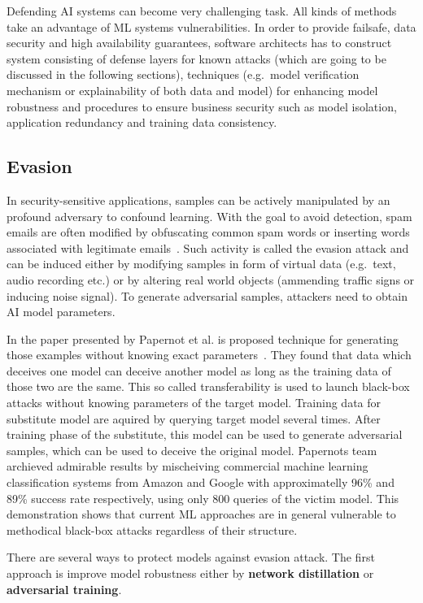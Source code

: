 Defending AI systems can become very challenging task.
All kinds of methods take an advantage of ML systems vulnerabilities.
In order to provide failsafe, data security and high availability guarantees, software architects has to construct system consisting of defense layers for known attacks (which are going to be discussed in the following sections), techniques (e.g.\ model verification mechanism or explainability of both data and model) for enhancing model robustness and procedures to ensure business security such as model isolation, application redundancy and training data consistency.

\subsection{Evasion}\label{subsec:evasion}

In security-sensitive applications, samples can be actively manipulated by an profound adversary to confound learning.
With the goal to avoid detection, spam emails are often modified by obfuscating common spam words or inserting words associated with legitimate emails~\cite{arxiv:evasion_attack}.
Such activity is called the evasion attack and can be induced either by modifying samples in form of virtual data (e.g.\ text, audio recording etc.) or by altering real world objects (ammending traffic signs or inducing noise signal).
To generate adversarial samples, attackers need to obtain AI model parameters.

In the paper presented by Papernot et al. is proposed technique for generating those examples without knowing exact parameters~\cite{arxiv:transferability_in_ml}.
They found that data which deceives one model can deceive another model as long as the training data of those two are the same.
This so called transferability is used to launch black-box attacks without knowing parameters of the target model.
Training data for substitute model are aquired by querying target model several times.
After training phase of the substitute, this model can be used to generate adversarial samples, which can be used to deceive the original model.
Papernots team archieved admirable results by mischeiving commercial machine learning classification systems from Amazon and Google with approximatelly 96\% and 89\% success rate respectively, using only 800 queries of the victim model.
This demonstration shows that current ML approaches are in general vulnerable to methodical black-box attacks regardless of their structure.

There are several ways to protect models against evasion attack.
The first approach is improve model robustness either by \textbf{network distillation} or \textbf{adversarial training}.

